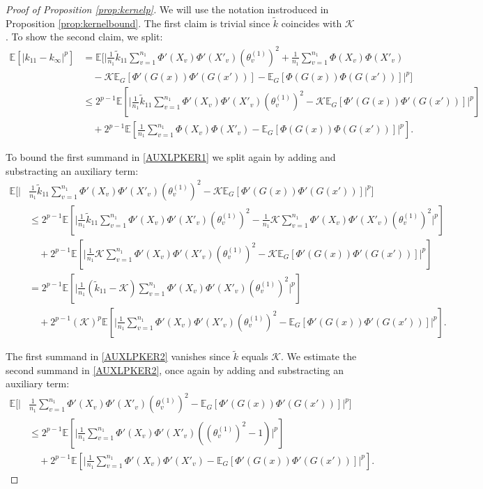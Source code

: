 \documentclass{article}
\theoremstyle{definition}
\theoremstyle{remark}
\numberwithin{equation}{section}
\newcommand{\E}{\mathbb{E}}
\begin{document}
\begin{proof}[Proof of Proposition \ref{prop:kernelp}]
    We will use the notation instroduced in Proposition \ref{prop:kernelbound}.
    The first claim is trivial since $\tilde k$ coincides with $\mathcal K$.
    To show the second claim, we split:
    \begin{align}
        \E[\vert k_{11}-k_\infty\vert^p] &= \E[\vert \frac{1}{n_1}\tilde k_{11}\sum_{v=1}^{n_1}\Phi'(X_v)\Phi'(X'_v)(\theta^{(1)}_v)^2 + \frac{1}{n_1}\sum_{v=1}^{n_1}\Phi(X_v)\Phi(X'_v) \\
        &\quad - \mathcal K\E_G[\Phi'(G(x))\Phi'(G(x'))] - \E_G[\Phi(G(x))\Phi(G(x'))]\vert^p] \\
        &\label{AUXLPKER1}\le 2^{p-1}\E[\vert \frac{1}{n_1}\tilde k_{11}\sum_{v=1}^{n_1}\Phi'(X_v)\Phi'(X'_v)(\theta^{(1)}_v)^2 - \mathcal K\E_G[\Phi'(G(x))\Phi'(G(x'))]\vert^p] \\
        &\quad  + 2^{p-1}\E[\frac{1}{n_1}\sum_{v=1}^{n_1}\Phi(X_v)\Phi(X'_v)- \E_G[\Phi(G(x))\Phi(G(x'))]\vert^p].
    \end{align}

    To bound the first summand in \eqref{AUXLPKER1} we split again by adding and substracting an auxiliary term:
    \begin{align}
        \E[\vert &\frac{1}{n_1}\tilde k_{11}\sum_{v=1}^{n_1}\Phi'(X_v)\Phi'(X'_v)(\theta^{(1)}_v)^2 - \mathcal K\E_G[\Phi'(G(x))\Phi'(G(x'))]\vert^p] \\
        &\le 2^{p-1}\E[\vert \frac{1}{n_1}\tilde k_{11}\sum_{v=1}^{n_1}\Phi'(X_v)\Phi'(X'_v)(\theta^{(1)}_v)^2 - \frac{1}{n_1}\mathcal K\sum_{v=1}^{n_1}\Phi'(X_v)\Phi'(X'_v)(\theta^{(1)}_v)^2\vert^p] \\
        &\quad + 2^{p-1}\E[\vert \frac{1}{n_1}\mathcal K\sum_{v=1}^{n_1}\Phi'(X_v)\Phi'(X'_v)(\theta^{(1)}_v)^2 - \mathcal K\E_G[\Phi'(G(x))\Phi'(G(x'))]\vert^p] \\
        &\label{AUXLPKER2}= 2^{p-1}\E[\vert \frac{1}{n_1}(\tilde k_{11}-\mathcal K)\sum_{v=1}^{n_1}\Phi'(X_v)\Phi'(X'_v)(\theta^{(1)}_v)^2\vert^p] \\
        &\quad + 2^{p-1}(\mathcal K)^p\E[\vert \frac{1}{n_1}\sum_{v=1}^{n_1}\Phi'(X_v)\Phi'(X'_v)(\theta^{(1)}_v)^2 - \E_G[\Phi'(G(x))\Phi'(G(x'))]\vert^p].
    \end{align}

    The first summand in \eqref{AUXLPKER2} vanishes since $\tilde k$ equals $\mathcal K$.
    We estimate the second summand in \eqref{AUXLPKER2}, once again by adding and substracting an auxiliary term:
    \begin{align}
        \E[\vert &\frac{1}{n_1}\sum_{v=1}^{n_1}\Phi'(X_v)\Phi'(X'_v)(\theta^{(1)}_v)^2 - \E_G[\Phi'(G(x))\Phi'(G(x'))]\vert^p]\\
        &\label{AUXLPKER3}\le 2^{p-1}\E[\vert \frac{1}{n_1}\sum_{v=1}^{n_1}\Phi'(X_v)\Phi'(X'_v)((\theta^{(1)}_v)^2-1)\vert^p] \\
        &\quad + 2^{p-1}\E[\vert\frac{1}{n_1}\sum_{v=1}^{n_1}\Phi'(X_v)\Phi'(X'_v) - \E_G[\Phi'(G(x))\Phi'(G(x'))]\vert^p].
    \end{align}


\end{proof}
\end{document}

